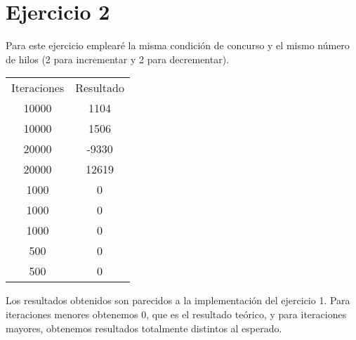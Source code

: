 \documentclass{article}
\begin{document}
\section{Ejercicio 2}
Para este ejercicio emplearé la misma condición de concurso y el mismo número de hilos (2 para incrementar y 2 para decrementar).
\begin{center}
 \begin{tabular}{|c| c|}
 	Iteraciones & Resultado \\
 	10000 & 1104	\\
 	10000 & 1506	\\
 	20000 & -9330 	\\
 	20000 & 12619 	\\
 	1000 & 0	\\
 	1000 & 0 \\
 	1000 & 0 \\
 	500 & 0 \\
 	500 & 0 
 \end{tabular}
 
\end{center}
\hfill \break
Los resultados obtenidos son parecidos a la implementación del ejercicio 1. Para iteraciones menores obtenemos 0, que es el resultado teórico, y para iteraciones mayores, obtenemos resultados totalmente distintos al esperado.
\end{document}
